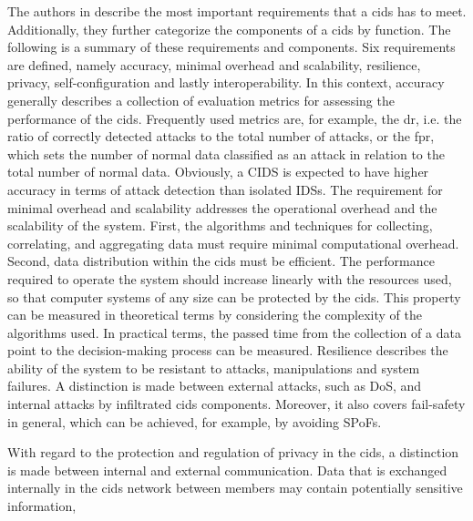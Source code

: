The authors in \cite{Vasilomanolakis2015SkipMon} describe the most important requirements that a \gls{cids} has to meet. Additionally, they further categorize the components of a \gls{cids} by function. The following is a summary of these requirements and components. Six requirements are defined, namely accuracy, minimal overhead and scalability, resilience, privacy, self-configuration and lastly interoperability. In this context, accuracy generally describes a collection of evaluation metrics for assessing the performance of the \gls{cids}. Frequently used metrics are, for example, the \gls{dr}, i.e. the ratio of correctly detected attacks to the total number of attacks, or the \gls{fpr}, which sets the number of normal data classified as an attack in relation to the total number of normal data. Obviously, a CIDS is expected to have higher accuracy in terms of attack detection than isolated IDSs. The requirement for minimal overhead and scalability addresses the operational overhead and the scalability of the system. First, the algorithms and techniques for collecting, correlating, and aggregating data must require minimal computational overhead. Second, data distribution within the \acrshort{cids} must be efficient. The performance required to operate the system should increase linearly with the resources used, so that computer systems of any size can be protected by the \gls{cids}. This property can be measured in theoretical terms by considering the complexity of the algorithms used. In practical terms, the passed time from the collection of a data point to the decision-making process can be measured. Resilience describes the ability of the system to be resistant to attacks, manipulations and system failures. A distinction is made between external attacks, such as DoS, and internal attacks by infiltrated \gls{cids} components. Moreover, it also covers fail-safety in general, which can be achieved, for example, by avoiding SPoFs. 

With regard to the protection and regulation of privacy in the \gls{cids}, a distinction is made between internal and external communication. Data that is exchanged internally in the \gls{cids} network between members may contain potentially sensitive information,

